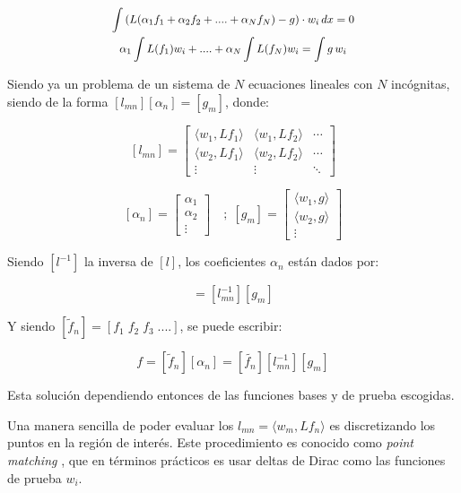 \documentclass[12pt, twocolumn]{article}
\begin{document}
\begin{equation*}
    \scalebox{0.9}{$
        \begin{gathered}
            \int{(L(\alpha_1f_1 +\alpha_2f_2+....+\alpha_Nf_N) -g)\cdot w_i \, dx }=0 \\
            \alpha_1 \int{L(f_1) w_i} +....+ \alpha_N \int{L(f_N) w_i} = \int{g\, w_i}
        \end{gathered}
    $}
\end{equation*}

Siendo ya un problema de un sistema de $N$ ecuaciones lineales con $N$ incógnitas, siendo de la forma $[l_{mn}][\alpha_n] = [g_m]$, donde:

\[
[l_{mn}] = 
\begin{bmatrix}
\langle w_1, Lf_1 \rangle & \langle w_1, Lf_2 \rangle & \cdots \\
\langle w_2, Lf_1 \rangle & \langle w_2, Lf_2 \rangle & \cdots \\
\vdots & \vdots & \ddots
\end{bmatrix}
\]

\[
[\alpha_n] = 
\begin{bmatrix}
\alpha_1 \\
\alpha_2 \\
\vdots
\end{bmatrix}
\quad
; \;
[g_m] = 
\begin{bmatrix}
\langle w_1, g \rangle \\
\langle w_2, g \rangle \\
\vdots
\end{bmatrix}
\]

Siendo $[l^{-1}]$ la inversa de $[l]$, los coeficientes $\alpha_n$ están dados por:

\begin{equation*}
    [\alpha_n] = [l_{mn}^{-1}][g_m]
\end{equation*}

Y siendo $[\tilde{f}_n] = [f_1 \; f_2\;f_3\;....]$, se puede escribir:

\begin{equation*}
    f = [\tilde{f}_n][\alpha_n] = [\tilde{f_n}][l_{mn}^{-1}][g_m]
\end{equation*}

Esta solución dependiendo entonces de las funciones bases y de prueba escogidas.

Una manera sencilla de poder evaluar los $l_{mn} = \langle w_m, Lf_n \rangle$ es discretizando los puntos en la región de interés. Este procedimiento es conocido como \textit{point matching} \cite{MoM_og}, que en términos prácticos es usar deltas de Dirac como las funciones de prueba $w_i$.
\end{document}
